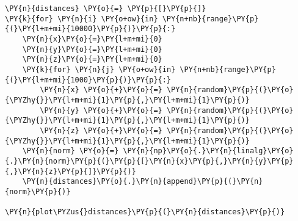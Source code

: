     \begin{tcolorbox}[breakable, size=fbox, boxrule=1pt, pad at break*=1mm,colback=cellbackground, colframe=cellborder]
\begin{Verbatim}[commandchars=\\\{\}]
\PY{n}{distances} \PY{o}{=} \PY{p}{[}\PY{p}{]}
\PY{k}{for} \PY{n}{i} \PY{o+ow}{in} \PY{n+nb}{range}\PY{p}{(}\PY{l+m+mi}{10000}\PY{p}{)}\PY{p}{:}
    \PY{n}{x}\PY{o}{=}\PY{l+m+mi}{0}
    \PY{n}{y}\PY{o}{=}\PY{l+m+mi}{0}
    \PY{n}{z}\PY{o}{=}\PY{l+m+mi}{0}
    \PY{k}{for} \PY{n}{j} \PY{o+ow}{in} \PY{n+nb}{range}\PY{p}{(}\PY{l+m+mi}{1000}\PY{p}{)}\PY{p}{:}
        \PY{n}{x} \PY{o}{+}\PY{o}{=} \PY{n}{random}\PY{p}{(}\PY{o}{\PYZhy{}}\PY{l+m+mi}{1}\PY{p}{,}\PY{l+m+mi}{1}\PY{p}{)}
        \PY{n}{y} \PY{o}{+}\PY{o}{=} \PY{n}{random}\PY{p}{(}\PY{o}{\PYZhy{}}\PY{l+m+mi}{1}\PY{p}{,}\PY{l+m+mi}{1}\PY{p}{)}
        \PY{n}{z} \PY{o}{+}\PY{o}{=} \PY{n}{random}\PY{p}{(}\PY{o}{\PYZhy{}}\PY{l+m+mi}{1}\PY{p}{,}\PY{l+m+mi}{1}\PY{p}{)}
    \PY{n}{norm} \PY{o}{=} \PY{n}{np}\PY{o}{.}\PY{n}{linalg}\PY{o}{.}\PY{n}{norm}\PY{p}{(}\PY{p}{[}\PY{n}{x}\PY{p}{,}\PY{n}{y}\PY{p}{,}\PY{n}{z}\PY{p}{]}\PY{p}{)}
    \PY{n}{distances}\PY{o}{.}\PY{n}{append}\PY{p}{(}\PY{n}{norm}\PY{p}{)}

\PY{n}{plot\PYZus{}distances}\PY{p}{(}\PY{n}{distances}\PY{p}{)}
\end{Verbatim}
\end{tcolorbox}

    \begin{center}
    \end{center}
    { \hspace*{\fill} \\}
